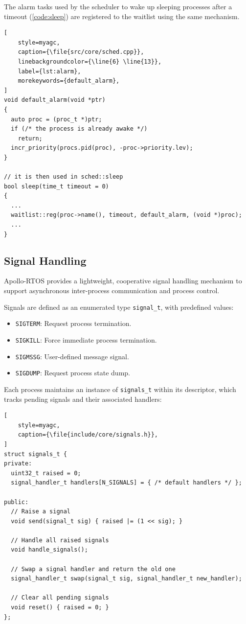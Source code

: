 The alarm tasks used by the scheduler to wake up sleeping processes after a timeout
(\autoref{code:sleep}) are registered to the waitlist using the same mechanism.

\begin{lstlisting}[
    style=myagc,
    caption={\file{src/core/sched.cpp}},
    linebackgroundcolor={\line{6} \line{13}},
    label={lst:alarm},
    morekeywords={default_alarm},
]
void default_alarm(void *ptr)
{
  auto proc = (proc_t *)ptr;
  if (/* the process is already awake */)
    return;
  incr_priority(procs.pid(proc), -proc->priority.lev);
}

// it is then used in sched::sleep
bool sleep(time_t timeout = 0)
{
  ...
  waitlist::reg(proc->name(), timeout, default_alarm, (void *)proc);
  ...
}
\end{lstlisting}


\subsection{Signal Handling}
\label{sec:signals}

Apollo-RTOS provides a lightweight, cooperative signal handling mechanism to support
asynchronous inter-process communication and process control.

Signals are defined as an enumerated type \lstinline[style=myagc]|signal_t|, with
predefined values:
\begin{itemize}
    \item \lstinline[style=myagc]|SIGTERM|: Request process termination.
    \item \lstinline[style=myagc]|SIGKILL|: Force immediate process termination.
    \item \lstinline[style=myagc]|SIGMSSG|: User-defined message signal.
    \item \lstinline[style=myagc]|SIGDUMP|: Request process state dump.
\end{itemize}

Each process maintains an instance of \lstinline[style=myagc]|signals_t| within its
descriptor, which tracks pending signals and their associated handlers:

\ifsubmission\newpage\fi
\begin{lstlisting}[
    style=myagc,
    caption={\file{include/core/signals.h}},
]
struct signals_t {
private:
  uint32_t raised = 0;
  signal_handler_t handlers[N_SIGNALS] = { /* default handlers */ };

public:
  // Raise a signal
  void send(signal_t sig) { raised |= (1 << sig); }

  // Handle all raised signals
  void handle_signals();

  // Swap a signal handler and return the old one
  signal_handler_t swap(signal_t sig, signal_handler_t new_handler);

  // Clear all pending signals
  void reset() { raised = 0; }
};
\end{lstlisting}

